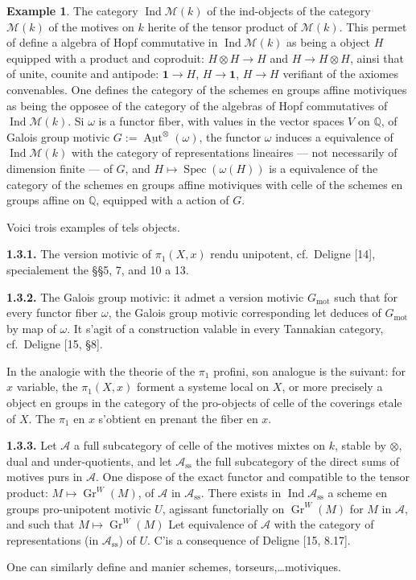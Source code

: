 \documentclass[11pt,a4paper]{article}
\theoremstyle{plain}
\theoremstyle{definition}
\newtheorem{example}[theorem]{Example}
\DeclareMathOperator{\Spec}{Spec}
\DeclareMathOperator{\Aut}{Aut}
\DeclareMathOperator{\Gr}{Gr}
\DeclareMathOperator{\Ind}{Ind}
\newcommand{\Q}{\mathbb{Q}}
\DeclareMathOperator{\mot}{mot}
\begin{document}
\begin{example}
The category $\Ind\mathcal{M}(k)$ of the ind-objects of the category $\mathcal{M}(k)$ of the motives on $k$ herite of the tensor product of $\mathcal{M}(k)$. This permet of define a algebra of Hopf commutative in $\Ind\mathcal{M}(k)$ as being a object $H$ equipped with a product and coproduit: $H \otimes H \to H$ and $H \to H \otimes H$, ainsi that of unite, counite and antipode: $\mathbf{1} \to H$, $H \to \mathbf{1}$, $H \to H$ verifiant of the axiomes convenables. One defines the category of the schemes en groups affine motiviques as being the opposee of the category of the algebras of Hopf commutatives of $\Ind\mathcal{M}(k)$. Si $\omega$ is a functor fiber, with values in the vector spaces $V$ on $\Q$, of Galois group motivic $G := \underline{\Aut}^{\otimes}(\omega)$, the functor $\omega$ induces a equivalence of $\Ind\mathcal{M}(k)$ with the category of representations lineaires --- not necessarily of dimension finite --- of $G$, and $H \mapsto \Spec(\omega(H))$ is a equivalence of the category of the schemes en groups affine motiviques with celle of the schemes en groups affine on $\Q$, equipped with a action of $G$.

Voici trois examples of tels objects.

\textbf{1.3.1.} The version motivic of $\pi_1(X, x)$ rendu unipotent, cf.~Deligne [14], specialement the \S\S5, 7, and 10 a 13.

\textbf{1.3.2.} The Galois group motivic: it admet a version motivic $G_{\mot}$ such that for every functor fiber $\omega$, the Galois group motivic corresponding let deduces of $G_{\mot}$ by map of $\omega$. It s'agit of a construction valable in every Tannakian category, cf.~Deligne [15, \S8].

In the analogie with the theorie of the $\pi_1$ profini, son analogue is the suivant: for $x$ variable, the $\pi_1(X, x)$ forment a systeme local on $X$, or more precisely a object en groups in the category of the pro-objects of celle of the coverings etale of $X$. The $\pi_1$ en $x$ s'obtient en prenant the fiber en $x$.

\textbf{1.3.3.} Let $\mathcal{A}$ a full subcategory of celle of the motives mixtes on $k$, stable by $\otimes$, dual and under-quotients, and let $\mathcal{A}_{\mathrm{ss}}$ the full subcategory of the direct sums of motives purs in $\mathcal{A}$. One dispose of the exact functor and compatible to the tensor product: $M \mapsto \Gr^W(M)$, of $\mathcal{A}$ in $\mathcal{A}_{\mathrm{ss}}$. There exists in $\Ind\mathcal{A}_{\mathrm{ss}}$ a scheme en groups pro-unipotent motivic $U$, agissant functorially on $\Gr^W(M)$ for $M$ in $\mathcal{A}$, and such that $M \mapsto \Gr^W(M)$ Let equivalence of $\mathcal{A}$ with the category of representations (in $\mathcal{A}_{\mathrm{ss}}$) of $U$. C'is a consequence of Deligne [15, 8.17].

One can similarly define and manier schemes, torseurs,\ldots motiviques.
\end{example}
\end{document}

